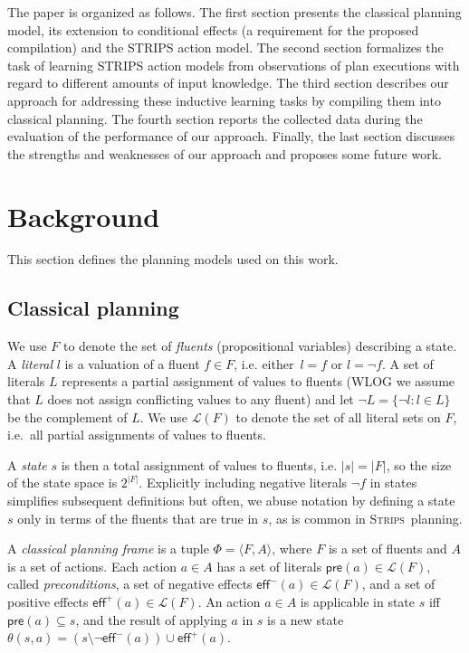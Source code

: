 \documentclass[letterpaper]{article} %
\newcommand{\tup}[1]{{\langle #1 \rangle}}
\newcommand{\pre}{\mathsf{pre}}     %
\newcommand{\eff}{\mathsf{eff}}     %
\newcommand{\strips}{\textsc{Strips}}     %
\begin{document}
The paper is organized as follows. The first section presents the classical planning model, its extension to conditional effects (a requirement for the proposed compilation) and the STRIPS action model. The second section formalizes the task of learning STRIPS action models from observations of plan executions with regard to different amounts of input knowledge. The third section describes our approach for addressing these inductive learning tasks by compiling them into classical planning. The fourth section reports the collected data during the evaluation of the performance of our approach. Finally, the last section discusses the strengths and weaknesses of our approach and proposes some future work. 
 

\section{Background}
This section defines the planning models used on this work.

\subsection{Classical planning}
We use $F$ to denote the set of {\em fluents} (propositional variables) describing a state. A {\em literal} $l$ is a valuation of a fluent $f\in F$, i.e. either~$l=f$ or $l=\neg f$. A set of literals $L$ represents a partial assignment of values to fluents (WLOG we assume that $L$ does not assign conflicting values to any fluent) and let $\neg L=\{\neg l:l\in L\}$ be the complement of $L$. We use $\mathcal{L}(F)$ to denote the set of all literal sets on $F$, i.e.~all partial assignments of values to fluents.

A {\em state} $s$ is then a total assignment of values to fluents, i.e. $|s|=|F|$, so the size of the state space is $2^{|F|}$. Explicitly including negative literals $\neg f$ in states simplifies subsequent definitions but often, we abuse notation by defining a state $s$ only in terms of the fluents that are true in $s$, as is common in \strips\ planning.

A {\em classical planning frame} is a tuple $\Phi=\tup{F,A}$, where $F$ is a set of fluents and $A$ is a set of actions. Each action $a\in A$ has a set of literals $\pre(a)\in\mathcal{L}(F)$, called {\em preconditions}, a set of negative effects $\eff^-(a)\in\mathcal{L}(F)$, and a set of positive effects $\eff^+(a)\in\mathcal{L}(F)$. An action $a\in A$ is applicable in state $s$ iff $\pre(a)\subseteq s$, and the result of applying $a$ in $s$ is a new state $\theta(s,a)=(s\setminus \neg\eff^-(a))\cup\eff^+(a)$.
\end{document}
